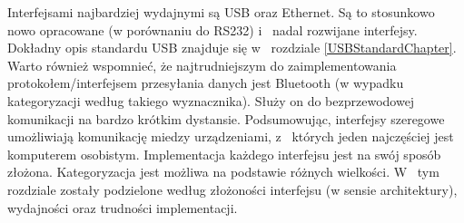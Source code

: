 \documentclass{BscUS}
\begin{document}
\indent Interfejsami najbardziej wydajnymi są USB oraz Ethernet. Są to stosunkowo nowo opracowane (w porównaniu do RS232) i~ nadal rozwijane interfejsy. Dokładny opis standardu USB znajduje się w~ rozdziale \ref{USBStandardChapter}.
Warto również wspomnieć, że najtrudniejszym do zaimplementowania protokołem/interfejsem przesyłania danych jest Bluetooth (w wypadku kategoryzacji według takiego wyznacznika). Służy on do bezprzewodowej komunikacji na bardzo krótkim dystansie.
\newline
\indent Podsumowując, interfejsy szeregowe umożliwiają komunikację miedzy urządzeniami, z~ których jeden najczęściej jest komputerem osobistym. Implementacja każdego interfejsu jest na swój sposób złożona. Kategoryzacja jest możliwa na podstawie różnych wielkości. W~ tym rozdziale zostały podzielone według złożoności interfejsu (w sensie architektury), wydajności oraz trudności implementacji.
\end{document}

